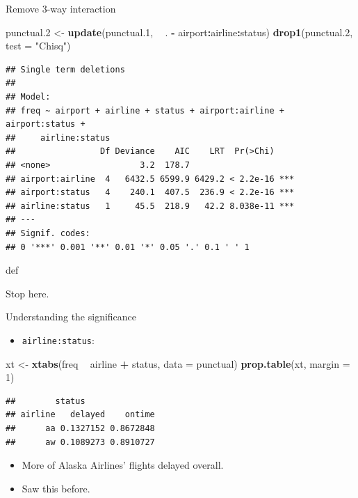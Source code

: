 \documentclass[ignorenonframetext,]{beamer}
\newenvironment{Shaded}{\begin{snugshade}}{\end{snugshade}}
\newcommand{\DataTypeTok}[1]{\textcolor[rgb]{0.13,0.29,0.53}{#1}}
\newcommand{\DecValTok}[1]{\textcolor[rgb]{0.00,0.00,0.81}{#1}}
\newcommand{\FloatTok}[1]{\textcolor[rgb]{0.00,0.00,0.81}{#1}}
\newcommand{\KeywordTok}[1]{\textcolor[rgb]{0.13,0.29,0.53}{\textbf{#1}}}
\newcommand{\NormalTok}[1]{#1}
\newcommand{\OperatorTok}[1]{\textcolor[rgb]{0.81,0.36,0.00}{\textbf{#1}}}
\newcommand{\StringTok}[1]{\textcolor[rgb]{0.31,0.60,0.02}{#1}}
\providecommand{\tightlist}{%
  \setlength{\itemsep}{0pt}\setlength{\parskip}{0pt}}
\begin{document}
\begin{frame}[fragile]{Remove 3-way interaction}
\protect\hypertarget{remove-3-way-interaction}{}

\begin{Shaded}
\begin{Highlighting}[]
\NormalTok{punctual}\FloatTok{.2}\NormalTok{ <-}\StringTok{ }\KeywordTok{update}\NormalTok{(punctual}\FloatTok{.1}\NormalTok{, }\OperatorTok{~}\StringTok{ }\NormalTok{. }\OperatorTok{-}\StringTok{ }\NormalTok{airport}\OperatorTok{:}\NormalTok{airline}\OperatorTok{:}\NormalTok{status)}
\KeywordTok{drop1}\NormalTok{(punctual}\FloatTok{.2}\NormalTok{, }\DataTypeTok{test =} \StringTok{"Chisq"}\NormalTok{)}
\end{Highlighting}
\end{Shaded}

\begin{verbatim}
## Single term deletions
## 
## Model:
## freq ~ airport + airline + status + airport:airline + airport:status + 
##     airline:status
##                 Df Deviance    AIC    LRT  Pr(>Chi)    
## <none>                  3.2  178.7                     
## airport:airline  4   6432.5 6599.9 6429.2 < 2.2e-16 ***
## airport:status   4    240.1  407.5  236.9 < 2.2e-16 ***
## airline:status   1     45.5  218.9   42.2 8.038e-11 ***
## ---
## Signif. codes:  
## 0 '***' 0.001 '**' 0.01 '*' 0.05 '.' 0.1 ' ' 1
\end{verbatim}

def

Stop here.

\end{frame}

\begin{frame}[fragile]{Understanding the significance}
\protect\hypertarget{understanding-the-significance}{}

\begin{itemize}
\tightlist
\item
  \texttt{airline:status}:
\end{itemize}

\begin{Shaded}
\begin{Highlighting}[]
\NormalTok{xt <-}\StringTok{ }\KeywordTok{xtabs}\NormalTok{(freq }\OperatorTok{~}\StringTok{ }\NormalTok{airline }\OperatorTok{+}\StringTok{ }\NormalTok{status, }\DataTypeTok{data =}\NormalTok{ punctual)}
\KeywordTok{prop.table}\NormalTok{(xt, }\DataTypeTok{margin =} \DecValTok{1}\NormalTok{)}
\end{Highlighting}
\end{Shaded}

\begin{verbatim}
##        status
## airline   delayed    ontime
##      aa 0.1327152 0.8672848
##      aw 0.1089273 0.8910727
\end{verbatim}

\begin{itemize}
\item
  More of Alaska Airlines' flights delayed overall.
\item
  Saw this before.
\end{itemize}

\end{frame}
\end{document}

